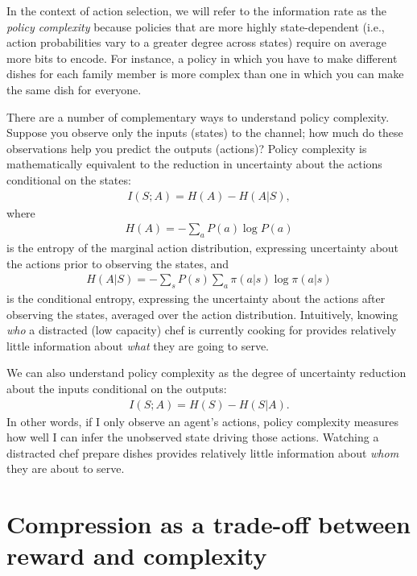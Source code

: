\documentclass[11pt]{article}
\begin{document}
In the context of action selection, we will refer to the information rate as the \emph{policy complexity} because policies that are more highly state-dependent (i.e., action probabilities vary to a greater degree across states) require on average more bits to encode. For instance, a policy in which you have to make different dishes for each family member is more complex than one in which you can make the same dish for everyone.

There are a number of complementary ways to understand policy complexity. Suppose you observe only the inputs (states) to the channel; how much do these observations help you predict the outputs (actions)? Policy complexity is mathematically equivalent to the reduction in uncertainty about the actions conditional on the states:
\begin{align}
    I(S;A) = H(A) - H(A|S),
\end{align}
where
\begin{align}
    H(A) = -\sum_a P(a) \log P(a)
\end{align}
is the entropy of the marginal action distribution, expressing uncertainty about the actions prior to observing the states, and
\begin{align}
    H(A|S) = -\sum_s P(s) \sum_a \pi(a|s) \log \pi(a|s)
\end{align}
is the conditional entropy, expressing the uncertainty about the actions after observing the states, averaged over the action distribution. Intuitively, knowing \textit{who} a distracted (low capacity) chef is currently cooking for provides relatively little information about \textit{what} they are going to serve.

We can also understand policy complexity as the degree of uncertainty reduction about the inputs conditional on the outputs:
\begin{align}
    I(S;A) = H(S) - H(S|A).
    \label{eq:infrate}
\end{align}
In other words, if I only observe an agent's actions, policy complexity measures how well I can infer the unobserved state driving those actions. Watching a distracted chef prepare dishes provides relatively little information about \textit{whom} they are about to serve.

\section{Compression as a trade-off between reward and complexity}
\end{document}
